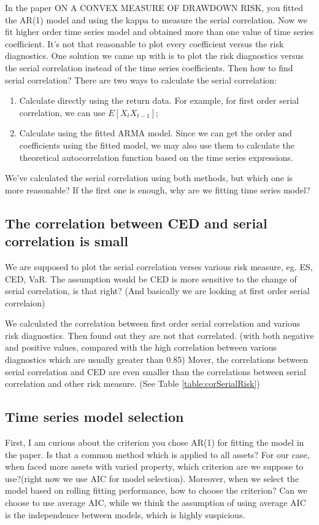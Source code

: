 \documentclass[12pt]{article}
\begin{document}
In the paper ON A CONVEX MEASURE OF DRAWDOWN RISK, you fitted the AR(1) model and using the kappa to measure the serial correlation. Now we fit higher order time series model and obtained more than one value of time series coefficient. It's not that reasonable to plot every coefficient versus the risk diagnostics. One solution we came up with is to plot the risk diagnostics versus the serial correlation instead of the time series coefficients. Then how to find serial correlation? 
There are two ways to calculate the serial correlation:
\begin{enumerate}
\item Calculate directly using the return data. For example, for first order serial correlation, we can use $E[X_t X_{t-1}]$;
\item Calculate using the fitted ARMA model. Since we can get the order and coefficients using the fitted model, we may also use them to calculate the theoretical autocorrelation function based on the time series expressions.
\end{enumerate}

We've calculated the serial correlation using both methods, but which one is more reasonable? If the first one is enough, why are we fitting time series model?

\subsection{The correlation between CED and serial correlation is small}

We are supposed to plot the serial correlation verses various risk measure, eg. ES, CED, VaR.  The assumption would be CED is more sensitive to the change of serial correlation, is that right? (And basically we are looking at first order serial correlaion)

We calculated the correlation between first order serial correlation and various risk diagnostics. Then found out they are not that correlated. (with both negative and positive values, compared with the high correlation between various diagnostics which are usually greater than 0.85) Mover, the correlations between serial correlation and CED are even smaller than the correlations between serial correlation and other risk measure. (See Table \ref{table:corSerialRisk})

\subsection{Time series model selection}
 
First, I am curious about the criterion you chose AR(1) for fitting the model in the paper. Is that a common method which is applied to all assets? For our case, when faced more assets with varied property, which criterion are we suppose to use?(right now we use AIC  for model selection). Moreover, when we select the model based on rolling fitting performance, how to choose the criterion? Can we choose to use average AIC, while we think the assumption of using average AIC is the independence between models, which is highly suspicious.


% 
% 
\end{document}
